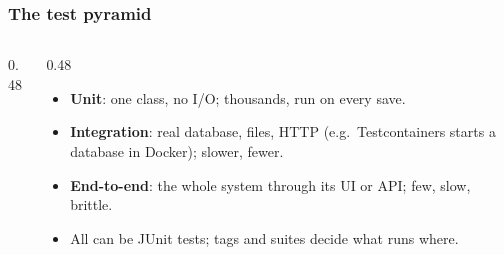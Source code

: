 \documentclass[aspectratio=169,10pt,compress]{beamer}
\begin{document}
\begin{frame}[t,fragile] \frametitle{The test pyramid}
  \begin{columns}[T]
    \begin{column}{0.48\textwidth}
      \begin{center}
      \end{center}
    \end{column}
    \begin{column}{0.48\textwidth}
      \begin{itemize}\small
        \item \textbf{Unit}: one class, no I/O; thousands, run on every save.
        \item \textbf{Integration}: real database, files, HTTP (e.g.\ Testcontainers starts a database in Docker); slower, fewer.
        \item \textbf{End-to-end}: the whole system through its UI or API; few, slow, brittle.
        \item All can be JUnit tests; tags and suites decide what runs where.
      \end{itemize}
    \end{column}
  \end{columns}
\end{frame}
\end{document}
